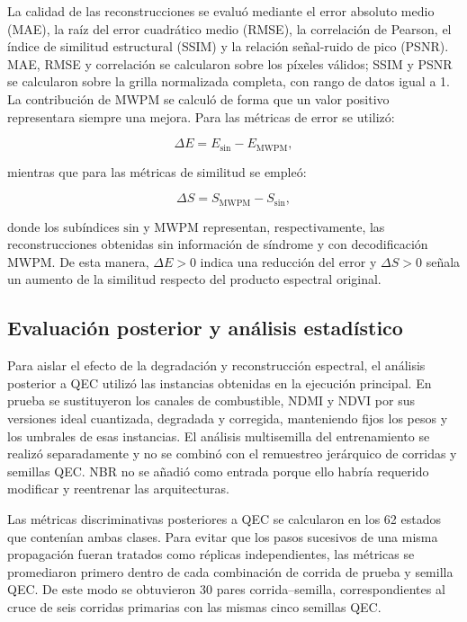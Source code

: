 \documentclass[fleqn,10pt]{wlscirep}
\begin{document}
La calidad de las reconstrucciones se evaluó mediante el error absoluto
medio (MAE), la raíz del error cuadrático medio (RMSE), la correlación
de Pearson, el índice de similitud estructural (SSIM) \cite{wang2004} y la relación
señal-ruido de pico (PSNR). MAE, RMSE y correlación se calcularon sobre los píxeles válidos; SSIM y PSNR se calcularon sobre la grilla normalizada completa, con rango de datos igual a 1. La contribución de MWPM se calculó de forma
que un valor positivo representara siempre una mejora. Para las métricas
de error se utilizó:

\begin{equation}
\Delta E = E_{\mathrm{sin}}-E_{\mathrm{MWPM}},
\label{eq:delta_error}
\end{equation}

mientras que para las métricas de similitud se empleó:

\begin{equation}
\Delta S = S_{\mathrm{MWPM}}-S_{\mathrm{sin}},
\label{eq:delta_similarity}
\end{equation}

donde los subíndices $\mathrm{sin}$ y $\mathrm{MWPM}$ representan,
respectivamente, las reconstrucciones obtenidas sin información de síndrome y
con decodificación MWPM. De esta manera, $\Delta E>0$ indica una
reducción del error y $\Delta S>0$ señala un aumento de la similitud
respecto del producto espectral original.

\subsection*{Evaluación posterior y análisis estadístico}

Para aislar el efecto de la degradación y reconstrucción espectral, el
análisis posterior a QEC utilizó las instancias obtenidas en la
ejecución principal. En prueba se sustituyeron los canales de combustible, NDMI
y NDVI por sus versiones ideal cuantizada, degradada y corregida,
manteniendo fijos los pesos y los umbrales de esas instancias. El
análisis multisemilla del entrenamiento se realizó separadamente y no
se combinó con el remuestreo jerárquico de corridas y semillas QEC. NBR
no se añadió como entrada porque ello habría requerido modificar y
reentrenar las arquitecturas.

Las métricas discriminativas posteriores a QEC se calcularon en los 62
estados que contenían ambas clases. Para evitar que los pasos sucesivos
de una misma propagación fueran tratados como réplicas independientes,
las métricas se promediaron primero dentro de cada combinación de
corrida de prueba y semilla QEC. De este modo se obtuvieron 30 pares
corrida--semilla, correspondientes al cruce de seis corridas primarias
con las mismas cinco semillas QEC.
\end{document}
